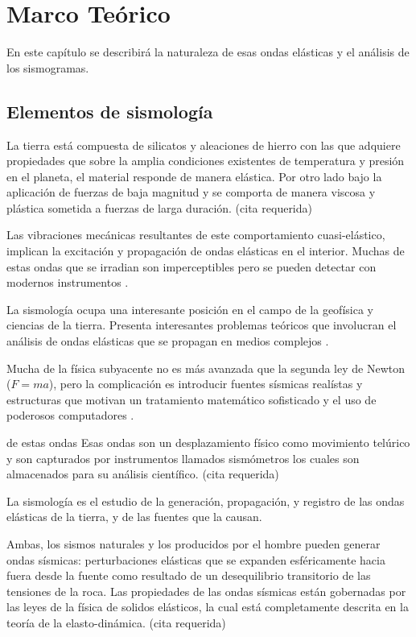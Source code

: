 \chapter{Marco Teórico}

En este capítulo se describirá la naturaleza de esas ondas elásticas y el
análisis de los sismogramas.

\section{Elementos de sismología}

La tierra está compuesta de silicatos y aleaciones de hierro con las que
adquiere propiedades que sobre la amplia condiciones existentes de temperatura y
presión en el planeta, el material responde de manera elástica.
Por otro lado bajo la aplicación de fuerzas de baja magnitud y se comporta de
manera viscosa y plástica sometida a fuerzas de larga duración. (cita requerida)

Las vibraciones mecánicas resultantes de este comportamiento cuasi-elástico,
implican la excitación y propagación de ondas elásticas en el interior. Muchas
de estas ondas que se irradian son imperceptibles pero se pueden detectar con
modernos instrumentos \cite[pp. 1]{Shearer2009}.

La sismología ocupa una interesante posición en el campo de la geofísica y
ciencias de la tierra. Presenta interesantes problemas teóricos que involucran
el análisis de ondas elásticas que se propagan en medios complejos \cite{Shearer2009}.

Mucha de la física subyacente no es más avanzada que la segunda ley de Newton
($F=ma$), pero la complicación es introducir fuentes sísmicas realístas y
estructuras que motivan un tratamiento matemático sofisticado y el uso de
poderosos computadores \cite{Shearer2009}.



de estas ondas Esas ondas son un desplazamiento físico como movimiento telúrico
y son capturados por instrumentos  llamados sismómetros los cuales son
almacenados para su  análisis científico. (cita requerida)

La sismología es el estudio de la generación, propagación, y registro de las
ondas elásticas de la tierra, y de las fuentes que la causan. 

Ambas, los sismos naturales y los producidos por el hombre pueden generar ondas
sísmicas:
perturbaciones elásticas que se expanden esféricamente hacia fuera desde la
fuente como resultado de un desequilibrio transitorio de las tensiones de la
roca. Las propiedades de las ondas sísmicas están gobernadas por las leyes de la
física de solidos elásticos, la cual está completamente descrita en la teoría de
la elasto-dinámica. (cita requerida)

